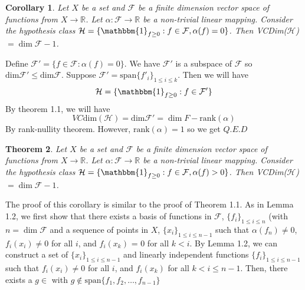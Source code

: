 \documentclass{article}
\newtheorem{theorem}{Theorem}[section]
\newtheorem{corollary}[theorem]{Corollary}
\begin{document}
\begin{corollary}
Let $X$ be a set and $\mathcal{F}$ be a finite dimension vector space of functions from $X \rightarrow \mathbb{R}$. Let $\alpha: \mathcal{F} \rightarrow \mathbb{R}$ be a non-trivial linear mapping. Consider the hypothesis class $\mathcal{H} = \{ \mathbbm{1}_{f \ge 0}: f \in \mathcal{F},\alpha(f) = 0 \}$. Then VCDim($\mathcal{H}$) $= \dim \mathcal{F}-1$.
\end{corollary}

Define $\mathcal{F'} = \{f \in \mathcal{F}: \alpha(f)=0 \}$. We have $\mathcal{F'}$ is a subspace of $\mathcal{F}$ so $\text{dim} \mathcal{F}' \leq \text{dim} \mathcal{F}$. Suppose $\mathcal{F}'=\text{span} \{f'_i \}_{1 \leq i \leq k}$. Then we will have
$$\mathcal{H} = \{\mathbbm{1}_{f \geq 0} : f \in \mathcal{F'}\}$$
By theorem 1.1, we will have
$$VC\text{dim}(\mathcal{H})=\text{dim} \mathcal{F'}=\dim{F}-\text{rank}(\alpha)$$
By rank-nullity theorem. However, $\text{rank}(\alpha)=1$
so we get $Q.E.D$

\begin{theorem}
Let $X$ be a set and $\mathcal{F}$ be a finite dimension vector space of functions from $X \rightarrow \mathbb{R}$. Let $\alpha: \mathcal{F} \rightarrow \mathbb{R}$ be a non-trivial linear mapping. Consider the hypothesis class $\mathcal{H} = \{ \mathbbm{1}_{f \ge 0}: f \in \mathcal{F},\alpha(f) > 0 \}$. Then VCDim($\mathcal{H}$) $= \dim \mathcal{F}-1$.
\end{theorem}

The proof of this corollary is similar to the proof of Theorem 1.1. As in Lemma 1.2, we first show that there exists a basis of functions in $\mathcal{F}$, $\{f_i\}_{1 \le i \le n}$ (with $n = \dim \mathcal{F}$ and a sequence of points in $X$, $\{x_i\}_{1 \le i \le n-1}$ such that $\alpha(f_n) \neq 0$, $f_i(x_i) \neq 0$ for all $i$, and $f_i(x_k)$ = 0 for all $k<i$. By Lemma 1.2, we can construct a set of $\{x_i\}_{1 \le i \le n-1}$ and linearly independent functions $\{f_i\}_{1 \le i \le n-1}$ such that $f_i(x_i) \neq 0$ for all $i$, and $f_i(x_k)$ for all $k<i \le n-1$. Then, there exists a $g \in \mathcal{}$ with $g \not \in \text{span} \{f_1, f_2, \dots, f_{n-1}\}$ 

\end{document}
